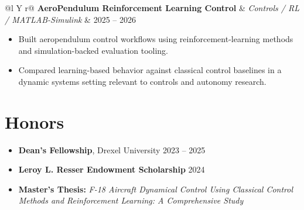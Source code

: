 \documentclass[10pt,letterpaper]{article}
\makeatletter
\newenvironment{project}[3]
{
\begin{tabularx}{\textwidth}{@{}l Y r@{}}
\textbf{#1} & \textit{#2} & #3
\end{tabularx}
\vspace{-0.45em}
\begin{itemize}[leftmargin=1.15em, itemsep=0.14em, topsep=0.15em]
}
{
\end{itemize}
\vspace{0.05em}
}
\makeatother
\begin{document}
\begin{project}
{AeroPendulum Reinforcement Learning Control}
{Controls / RL / MATLAB-Simulink}
{2025 -- 2026}
    \item Built aeropendulum control workflows using reinforcement-learning methods and simulation-backed evaluation tooling.
    \item Compared learning-based behavior against classical control baselines in a dynamic systems setting relevant to controls and autonomy research.
\end{project}

\section{Honors}

\begin{itemize}[leftmargin=1.15em, itemsep=0.14em, topsep=0.15em]
    \item \textbf{Dean's Fellowship}, Drexel University \hfill 2023 -- 2025
    \item \textbf{Leroy L. Resser Endowment Scholarship} \hfill 2024
    \item \textbf{Master's Thesis:} \textit{F-18 Aircraft Dynamical Control Using Classical Control Methods and Reinforcement Learning: A Comprehensive Study}
\end{itemize}
\end{document}
